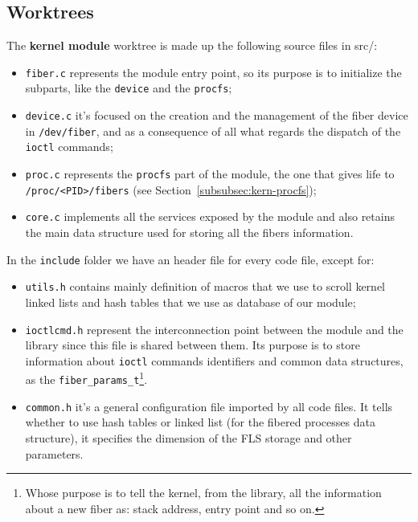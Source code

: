 \documentclass[a4paper,10pt]{article}
\begin{document}
\subsection{Worktrees}\label{subsec:worktrees}
  The \textbf{kernel module} worktree is made up the following source files in src/:
  \begin{itemize}
    \item \lstinline{fiber.c} represents the module entry point, so its purpose is to initialize the subparts, like the \lstinline{device} and the \lstinline{procfs};
    \item \lstinline{device.c} it's focused on the creation and the management of the fiber device in \lstinline{/dev/fiber}, and as a consequence of all what regards the dispatch of the \lstinline{ioctl} commands;
    \item \lstinline{proc.c} represents the \lstinline{procfs} part of the module, the one that gives life to \lstinline{/proc/<PID>/fibers} (see Section~\ref{subsubsec:kern-procfs});
    \item \lstinline{core.c} implements all the services exposed by the module and also retains the main data structure used for storing all the fibers information.
  \end{itemize}
  In the \lstinline{include} folder we have an header file for every code file, except for:
  \begin{itemize}
    \item \lstinline{utils.h} contains mainly definition of macros that we use to scroll kernel linked lists and hash tables that we use as database of our module;
    \item \lstinline{ioctlcmd.h} represent the interconnection point between the module and the library since this file is shared between them. Its purpose is to store information about \lstinline{ioctl} commands identifiers and common data structures, as the \lstinline{fiber_params_t}\footnote{Whose purpose is to tell the kernel, from the library, all the information about a new fiber as: stack address, entry point and so on.}.
    \item \lstinline{common.h} it's a general configuration file imported by all code files. It tells whether to use hash tables or linked list (for the fibered processes data structure), it specifies the dimension of the FLS storage and other parameters.
  \end{itemize}
\end{document}
